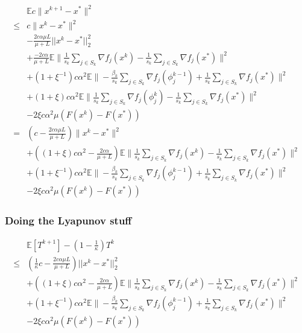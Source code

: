 \documentclass[12pt]{article}
\begin{document}
			\begin{align*}
				&\mathbb{E} c \|x^{k+1} - x^* \|^2  \\
				\leq  & c\|x^k - x^* \|^2 \\
				& -\frac{2c \alpha \mu L}{\mu+L}||x^k-x^*||_2^2 \\
				&+ \frac{-2c \alpha }{\mu+L}\mathbb{E} \| \frac{1}{s_k} \sum_{j \in S_k}   \nabla f_j(x^k) -\frac{1}{s_k} \sum_{j \in S_k}   \nabla f_j(x^*) \|^2\\
				&+(1+\xi^{-1})c \alpha^2\mathbb{E}   \|  - \frac{ \beta_k }{s_k} \sum_{j \in S_k}  \nabla f_j(\phi^{k-1}_j) + \frac{ 1}{s_k} \sum_{j \in S_k}  \nabla f_j(x^*)\|^2 \\
			&+ (1+\xi)c \alpha^2 \mathbb{E} \| \frac{1}{s_k} \sum_{j \in S_k}  \nabla f_j(\phi_j^{k}) - \frac{ 1 }{s_k} \sum_{j \in S_k}  \nabla f_j(x^*)\|^2  \\
			&- 2 \xi c \alpha^2 \mu (F(x^k) - F(x^*))\\
			=  &( c-\frac{2c \alpha \mu L}{\mu+L})\|x^k - x^* \|^2 \\
				&+ ((1+\xi)c \alpha^2 - \frac{2c \alpha }{\mu+L})\mathbb{E} \| \frac{1}{s_k} \sum_{j \in S_k}   \nabla f_j(x^k) -\frac{1}{s_k} \sum_{j \in S_k}   \nabla f_j(x^*) \|^2\\
				&+(1+\xi^{-1})c \alpha^2\mathbb{E}   \|  - \frac{ \beta_k }{s_k} \sum_{j \in S_k}  \nabla f_j(\phi^{k-1}_j) + \frac{ 1}{s_k} \sum_{j \in S_k}  \nabla f_j(x^*)\|^2 \\
			&- 2 \xi c \alpha^2 \mu (F(x^k) - F(x^*))
				\end{align*}
		
				\subsubsection{Doing the Lyapunov stuff}
		
				\begin{align*}
					&\mathbb{E}\left[ T^{k+1} \right] - \left(1-\frac{1}{\kappa} \right) T^k \\
					\leq  &(\frac{1}{\kappa} c-\frac{2c \alpha \mu L}{\mu+L})||x^k-x^*||_2^2 \\
				&+ ((1+\xi)c \alpha^2 - \frac{2c \alpha }{\mu+L})\mathbb{E} \| \frac{1}{s_k} \sum_{j \in S_k}   \nabla f_j(x^k) -\frac{1}{s_k} \sum_{j \in S_k}   \nabla f_j(x^*) \|^2\\
				&+(1+\xi^{-1})c \alpha^2\mathbb{E}   \|  - \frac{ \beta_k }{s_k} \sum_{j \in S_k}  \nabla f_j(\phi^{k-1}_j) + \frac{ 1}{s_k} \sum_{j \in S_k}  \nabla f_j(x^*)\|^2 \\
			&- 2 \xi c \alpha^2 \mu (F(x^k) - F(x^*))
					\end{align*}
			
\end{document}
